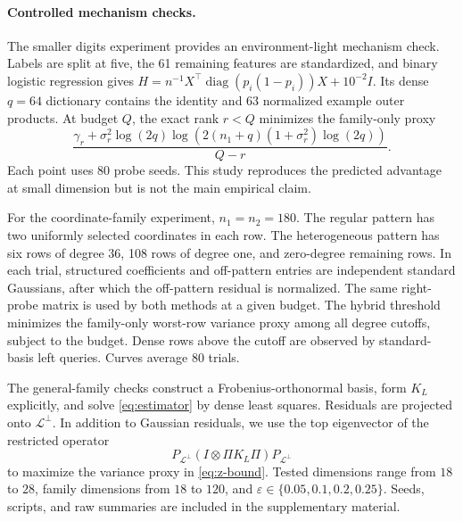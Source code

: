 \documentclass{article}
\theoremstyle{remark}
\newcommand{\cL}{\mathcal L}
\newcommand{\eps}{\varepsilon}
\newcommand{\1}{\mathbf 1}
\begin{document}
\paragraph{Controlled mechanism checks.}
The smaller digits experiment provides an environment-light mechanism check. Labels are split at five, the 61 remaining features are standardized, and binary logistic regression gives $H=n^{-1}X^\top\operatorname{diag}(p_i(1-p_i))X+10^{-2}I$.  Its dense $q=64$ dictionary contains the identity and 63 normalized example outer products.  At budget $Q$, the exact rank $r<Q$ minimizes the family-only proxy \[ \frac{\gamma_r+\sigma_r^2\log(2q) \log(2(n_1+q)(1+\sigma_r^2)\log(2q))}{Q-r}. \] Each point uses 80 probe seeds.  This study reproduces the predicted advantage at small dimension but is not the main empirical claim.

For the coordinate-family experiment, $n_1=n_2=180$.  The regular pattern has two uniformly selected coordinates in each row.  The heterogeneous pattern has six rows of degree 36, 108 rows of degree one, and zero-degree remaining rows.  In each trial, structured coefficients and off-pattern entries are independent standard Gaussians, after which the off-pattern residual is normalized.  The same right-probe matrix is used by both methods at a given budget.  The hybrid threshold minimizes the family-only worst-row variance proxy among all degree cutoffs, subject to the budget.  Dense rows above the cutoff are observed by standard-basis left queries.  Curves average 80 trials.

The general-family checks construct a Frobenius-orthonormal basis, form $K_L$ explicitly, and solve \eqref{eq:estimator} by dense least squares.  Residuals are projected onto $\cL^\perp$.  In addition to Gaussian residuals, we use the top eigenvector of the restricted operator \[ P_{\cL^\perp}(I\otimes\Pi K_L\Pi)P_{\cL^\perp} \] to maximize the variance proxy in \eqref{eq:z-bound}.  Tested dimensions range from $18$ to $28$, family dimensions from $18$ to $120$, and $\eps\in\{0.05,0.1,0.2,0.25\}$.  Seeds, scripts, and raw summaries are included in the supplementary material.
\end{document}
